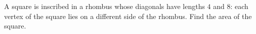 A square is inscribed in a rhombus whose diagonals have lengths $4$ and $8$: each vertex of the square lies on a different side of the rhombus. Find the area of the square.
